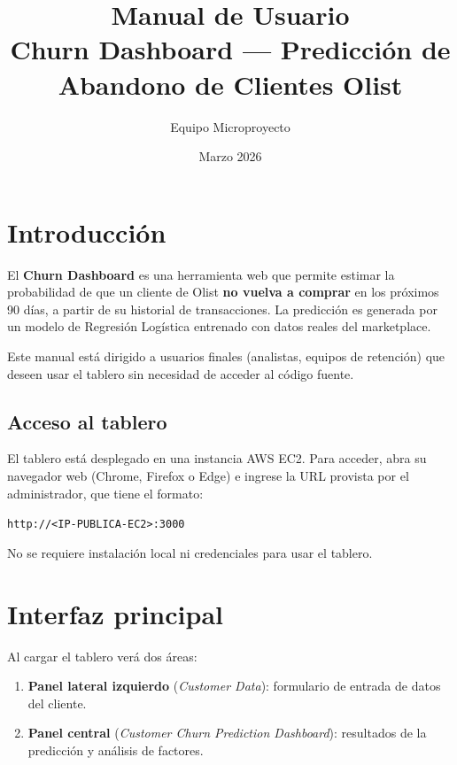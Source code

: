 \documentclass[11pt]{article}
\title{Manual de Usuario\\
\large Churn Dashboard --- Predicción de Abandono de Clientes Olist}
\author{Equipo Microproyecto}
\date{Marzo 2026}
\begin{document}
\maketitle
\tableofcontents
\newpage

\section{Introducción}

El \textbf{Churn Dashboard} es una herramienta web que permite estimar la
probabilidad de que un cliente de Olist \textbf{no vuelva a comprar} en los
próximos 90 días, a partir de su historial de transacciones. La predicción
es generada por un modelo de Regresión Logística entrenado con datos reales
del marketplace.

Este manual está dirigido a usuarios finales (analistas, equipos de retención)
que deseen usar el tablero sin necesidad de acceder al código fuente.

\subsection*{Acceso al tablero}

El tablero está desplegado en una instancia AWS EC2. Para acceder, abra su
navegador web (Chrome, Firefox o Edge) e ingrese la URL provista por el
administrador, que tiene el formato:

\begin{center}
  \texttt{http://<IP-PUBLICA-EC2>:3000}
\end{center}

No se requiere instalación local ni credenciales para usar el tablero.

\section{Interfaz principal}

Al cargar el tablero verá dos áreas:

\begin{enumerate}[itemsep=4pt]
  \item \textbf{Panel lateral izquierdo} (\textit{Customer Data}): formulario
        de entrada de datos del cliente.
  \item \textbf{Panel central} (\textit{Customer Churn Prediction Dashboard}):
        resultados de la predicción y análisis de factores.
\end{enumerate}
\end{document}
